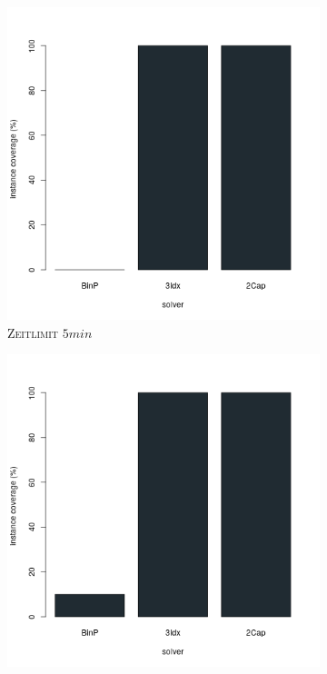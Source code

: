 \begin{figure}[H]
\centering

\begin{subfigure}[b]{0.3\textwidth}
\centering
\includegraphics[width=1.2\textwidth]{img/solver_instance_coverage_b=2_l_300s.png}
\caption{\textsc{Zeitlimit} $5min$}
\label{fig:instance_cov_b=2_l_a}
\end{subfigure}
\hfill
\begin{subfigure}[b]{0.3\textwidth}
\centering
\includegraphics[width=1.2\textwidth]{img/solver_instance_coverage_b=2_l_600s.png}

\end{subfigure}
\end{figure}
